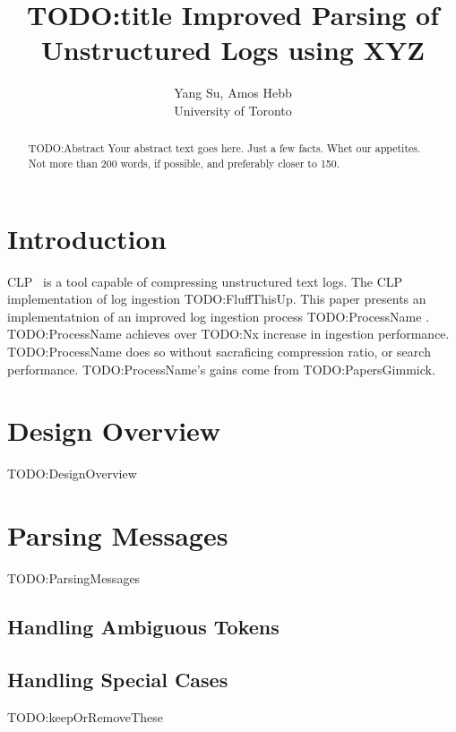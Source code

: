 \documentclass[letterpaper,twocolumn,10pt]{article}
\begin{document}
\date{}

\title{\Large \bf TODO:title Improved Parsing of Unstructured Logs using XYZ}

\author{
  {\rm Yang Su, Amos Hebb}\\
  University of Toronto
}

\maketitle

\begin{abstract}
  TODO:Abstract Your abstract text goes here. Just a few facts. Whet our appetites.
  Not more than 200 words, if possible, and preferably closer to 150.
\end{abstract}


\section{Introduction}

CLP~\cite{rodrigues2021clp} is a tool capable of compressing unstructured text logs. The CLP implementation of log ingestion TODO:FluffThisUp. This paper presents an implementatnion of an improved log ingestion process TODO:ProcessName . TODO:ProcessName achieves over TODO:Nx increase in ingestion performance. TODO:ProcessName does so without sacraficing compression ratio, or search performance. TODO:ProcessName's gains come from TODO:PapersGimmick.

\section{Design Overview}

TODO:DesignOverview

\section{Parsing Messages}

TODO:ParsingMessages

\subsection{Handling Ambiguous Tokens}
\subsection{Handling Special Cases}
TODO:keepOrRemoveThese
\end{document}
